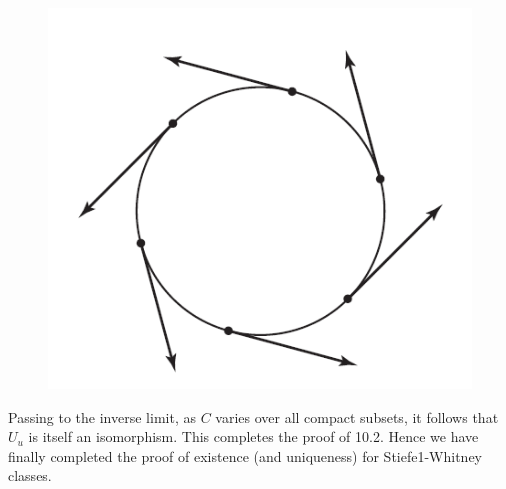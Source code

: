 \begin{figure}[!htb]
	\centering\includegraphics[scale=.6]{fig3}
	\caption{}\label{fig3}
\end{figure}

Passing to the inverse limit, as $C$ varies over all compact subsets, it follows that $U_{u}$ is itself an isomorphism. This completes the proof of 10.2. Hence we have finally completed the proof of existence (and uniqueness) for Stiefe1-Whitney classes.